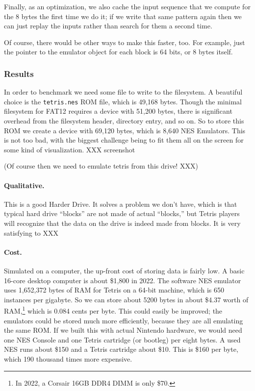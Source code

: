 \documentclass[twocolumn]{article}
\begin{document}
Finally, as an optimization, we also cache the input sequence that we
compute for the 8 bytes the first time we do it; if we write that same
pattern again then we can just replay the inputs rather than search
for them a second time.

Of course, there would be other ways to make this faster, too. For
example, just the pointer to the emulator object for each block is 64
bits, or 8 bytes itself.

\subsubsection{Results}

In order to benchmark we need some file to write to the filesystem. A
beautiful choice is the {\tt tetris.nes} ROM file, which is 49,168
bytes. Though the minimal filesystem for FAT12 requires a device with
51,200 bytes, there is significant overhead from the filesystem
header, directory entry, and so on. So to store this ROM we create a
device with 69,120 bytes, which is 8,640 NES Emulators. This is not
too bad, with the biggest challenge being to fit them all on the
screen for some kind of visualization. XXX screenshot

(Of course then we need to emulate tetris from this drive! XXX)

\paragraph{Qualitative.} This is a good Harder Drive. It solves a problem
we don't have, which is that typical hard drive ``blocks'' are not made
of actual ``blocks,'' but Tetris players will recognize that the data on
the drive is indeed made from blocks. It is very satisfying to  XXX

\paragraph{Cost.} Simulated on a computer, the up-front cost of storing
data is fairly low. A basic 16-core desktop computer is about \$1,800
in 2022. The software NES emulator uses 1,652,372 bytes of RAM for
Tetris on a 64-bit machine, which is 650 instances per gigabyte. So we
can store about 5200 bytes in about \$4.37 worth of RAM,\footnote{ In
  2022, a Corsair 16GB DDR4 DIMM is only \$70. } which is 0.084 cents
per byte. This could easily be improved; the emulators could be stored
much more efficiently, because they are all emulating the same ROM. If
we built this with actual Nintendo hardware, we would need one NES
Console and one Tetris cartridge (or bootleg) per eight bytes. A used
NES runs about \$150 and a Tetris cartridge about \$10. This is
\$160 per byte, which 190 thousand times more expensive.
\end{document}
